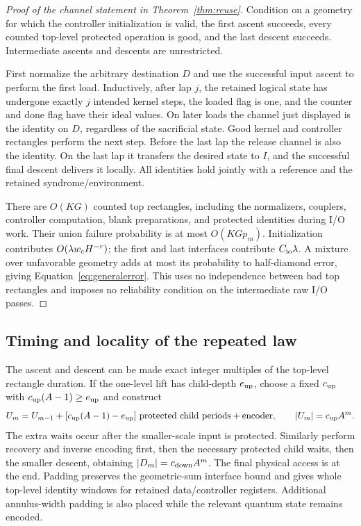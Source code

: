 \documentclass[11pt]{article}
\begin{document}
\begin{proof}[Proof of the channel statement in Theorem~\ref{thm:reuse}]
Condition on a geometry for which the controller initialization is valid,
the first ascent succeeds, every counted top-level protected operation
is good, and the last descent succeeds. Intermediate ascents and descents
are unrestricted.

First normalize the arbitrary destination $D$ and use the successful
input ascent to perform the first load. Inductively, after lap $j$,
the retained logical state has undergone exactly $j$ intended kernel
steps, the loaded flag is one, and the counter and done flag have their
ideal values. On later loads the channel just displayed is the identity
on $D$, regardless of the sacrificial state. Good kernel and controller
rectangles perform the next step. Before the last lap the release channel
is also the identity. On the last lap it transfers the desired state to
$I$, and the successful final descent delivers it locally. All identities
hold jointly with a reference and the retained syndrome/environment.

There are $O(KG)$ counted top rectangles, including the normalizers,
couplers, controller computation, blank preparations, and protected
identities during I/O work. Their union failure probability is at most
$O(KGp_m)$. Initialization contributes
$O(\lambda w_{\rm c}H^{-r})$; the first and last interfaces contribute
$C_{\rm io}\lambda$. A mixture over unfavorable geometry adds at most
its probability to half-diamond error, giving
Equation~\eqref{eq:generalerror}. This uses no independence between bad
top rectangles and imposes no reliability condition on the intermediate
raw I/O passes.
\end{proof}

\subsection{Timing and locality of the repeated law}

The ascent and descent can be made exact integer multiples of the
top-level rectangle duration. If the one-level lift has child-depth
$e_{\rm up}$, choose a fixed $c_{\rm up}$ with
$c_{\rm up}(A-1)\geq e_{\rm up}$ and construct
\[
 U_m=U_{m-1}
  +[c_{\rm up}(A-1)-e_{\rm up}]
       \text{ protected child periods}
  +\text{encoder},
 \qquad |U_m|=c_{\rm up}A^m.
\]
The extra waits occur after the smaller-scale input is protected.
Similarly perform recovery and inverse encoding first, then the
necessary protected child waits, then the smaller descent, obtaining
$|D_m|=c_{\rm down}A^m$. The final physical access is at the end.
Padding preserves the geometric-sum interface bound and gives whole
top-level identity windows for retained data/controller registers.
Additional annulus-width padding is also placed while the relevant
quantum state remains encoded.
\end{document}
